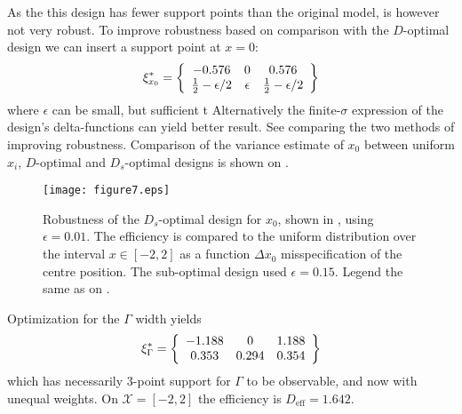\documentclass[12pt]{iopart}
\begin{document}
As the this design has fewer support points than the original model, is however not very robust. To improve robustness based on comparison with the $D$-optimal design we can insert a support point at $x=0$:
\begin{equation}
\xi^*_{x_0} = \left\{
  \begin{array}{c c c}
    -0.576 & 0 & 0.576 \\
    \frac{1}{2}-\epsilon/2 & \epsilon & \frac{1}{2}-\epsilon/2\\
  \end{array} \right \}
\label{eq:dsx0robust}
\end{equation}
where $\epsilon$ can be small, but sufficient t Alternatively the finite-$\sigma$ expression of the design's delta-functions can yield better result. See  comparing the two methods of improving robustness. Comparison of the variance estimate of $x_0$ between uniform $x_i$, $D$-optimal and $D_s$-optimal designs is shown on .

\begin{figure}
\texttt{[image: figure7.eps]}
\caption{Robustness of the $D_s$-optimal design for $x_0$, shown in , using $\epsilon = 0.01$. The efficiency is compared to the uniform distribution over the interval $x\in [-2,2]$ as a function $\Delta x_0$ misspecification of the centre position. The sub-optimal design used $\epsilon = 0.15$. Legend the same as on .}
\label{fig:dsx0robust}
\end{figure}



Optimization for the $\Gamma$ width yields
\begin{equation}
\xi^*_{\Gamma} = \left\{
  \begin{array}{c c c}
    -1.188 & 0 &  1.188 \\
    0.353 & 0.294 & 0.354\\
  \end{array} \right \}
\end{equation}
which has necessarily 3-point support for $\Gamma$ to be observable, and now with unequal weights. On $\mathcal{X} = [-2,2]$ the efficiency is $D_\mathrm{eff} = 1.642$.
\end{document}
